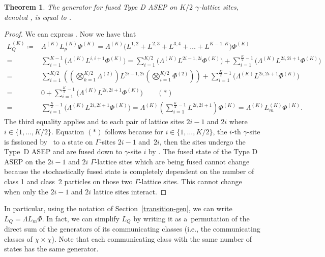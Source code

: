 \documentclass[pdftex]{sigma}
\numberwithin{equation}{section}
\newtheorem{Theorem}{Theorem}[section]
\theoremstyle{definition}
\begin{document}
\begin{Theorem}
\label{MiddleSwap}
The generator for fused Type D ASEP on $K/2$ $\gamma$-lattice sites, denoted , is equal to .
\end{Theorem}
\begin{proof}
 \label{MiddleSwapProof}
 We can express . Now we have that
 \begin{align*}
 L^{(K)}_Q\coloneqq{}& \Lambda^{(K)} L^{(K)}_p \Phi^{(K)} = \Lambda^{(K)} \bigl(L^{1,2}+L^{2,3}+L^{3,4}+\dots+L^{K-1,K}\bigr) \Phi^{(K)} \\
={}& \sum_{i=1}^{K-1}\bigl(\Lambda^{(K)}L^{i,i+1}\Phi^{(K)}\bigr) = \sum_{i=1}^{K/2} \bigl(\Lambda^{(K)}L^{2i-1,2i}\Phi^{(K)}\bigr) + \sum_{i=1}^{\frac{K}{2}-1} \bigl(\Lambda^{(K)}L^{2i,2i+1}\Phi^{(K)}\bigr) \\
={}&  \sum_{i=1}^{K/2} \left(\left(\bigotimes_{k=1}^{K/2} \Lambda^{(2)}\right)
 L^{2i-1,2i}\left(\bigotimes_{i=1}^{K/2} \Phi^{(2)}\right)\right) + \sum_{i=1}^{\frac{K}{2}-1} \bigl(\Lambda^{(K)}L^{2i,2i+1}\Phi^{(K)}\bigr) \\
={}&  0+\sum_{i=1}^{\frac{K}{2}-1} \bigl(\Lambda^{(K)}L^{2i,2i+1}\Phi^{(K)}\bigr) \hspace{2em} (*) \\
={}&  \sum_{i=1}^{\frac{K}{2}-1} \bigl(\Lambda^{(K)}L^{2i,2i+1}\Phi^{(K)}\bigr) = \Lambda^{(K)}\left(\sum_{i=1}^{\frac{K}{2}-1} L^{2i,2i+1}\right)\Phi^{(K)} = \Lambda^{(K)}L_m^{(K)}\Phi^{(K)}.
 \end{align*}
 The third equality applies  and  to each pair of lattice sites $2i-1$ and $2i$ where $i \in \{1,\dots ,K/2\}$. Equation $(*)$ follows because
 for $i \in \{1,\dots ,K/2\}$, the $i$-th $\gamma$-site is
fissioned by~ to a state on $\Gamma$-sites $2i-1$
and~$2i$, then the sites undergo the Type~D ASEP and are fused down
to $\gamma$-site $i$ by . The fused state of the Type D ASEP on the $2i-1$ and $2i$ $\Gamma$-lattice sites which are being fused cannot change because the stochastically fused state is completely dependent on the number of class 1 and class~2 particles on those two $\Gamma$-lattice sites. This cannot change when only the $2i-1$ and $2i$ lattice sites interact.
\end{proof}

In particular, using the notation of Section~\ref{transition-gen}, we can write $L_Q = \Lambda L_m \Phi$. In fact, we can simplify $L_Q$ by writing it as a~permutation of the direct sum of the generators of its communicating classes (i.e., the communicating classes of $\chi \times \chi$). Note that each communicating class with the same number of states has the same generator.
\end{document}
